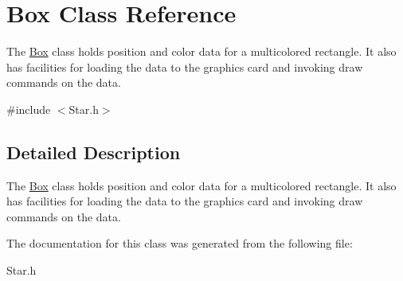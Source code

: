 \hypertarget{class_box}{}\section{Box Class Reference}
\label{class_box}


The \hyperlink{class_box}{Box} class holds position and color data for a multicolored rectangle. It also has facilities for loading the data to the graphics card and invoking draw commands on the data.  




{\ttfamily \#include $<$Star.\+h$>$}



\subsection{Detailed Description}
The \hyperlink{class_box}{Box} class holds position and color data for a multicolored rectangle. It also has facilities for loading the data to the graphics card and invoking draw commands on the data. 

The documentation for this class was generated from the following file\+:\begin{DoxyCompactItemize}
\item 
Star.\+h\end{DoxyCompactItemize}

